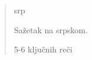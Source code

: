 \begin{abstract}
    \markboth{\abstractname}{}
\begin{scontents}[store-env=lang]
srp
\end{scontents}
\begin{scontents}[store-env=abstracts,print-env=true]
Sažetak na srpskom.
\end{scontents}

\begin{scontents}[store-env=keywords,print-env=true]
5-6 ključnih reči
\end{scontents}
\end{abstract}
\cleardoublepage
{}
